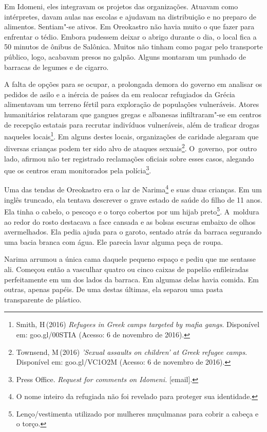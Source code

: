 Em Idomeni, eles integravam os projetos das organizações. Atuavam como
intérpretes, davam aulas nas escolas e ajudavam na distribuição e no
preparo de alimentos. Sentiam"-se ativos. Em Oreokastro não havia muito o
que fazer para enfrentar o tédio. Embora pudessem deixar o abrigo
durante o dia, o local fica a 50 minutos de ônibus de Salônica. Muitos
não tinham como pagar pelo transporte público, logo, acabavam presos no
galpão. Alguns montaram um punhado de barracas de legumes e de cigarro.

A falta de opções para se ocupar, a prolongada demora do governo em
analisar os pedidos de asilo e a inércia de países da  em realocar
refugiados da Grécia alimentavam um terreno fértil para exploração de
populações vulneráveis. Atores humanitários relataram que gangues gregas
e albanesas infiltraram"-se em centros de recepção estatais para recrutar
indivíduos vulneráveis, além de traficar drogas naqueles
locais\footnote{ Smith, H\,(2016) \emph{Refugees in Greek camps
targeted by mafia gangs}. Disponível em:
goo.gl/00STIA
(Acesso: 6 de novembro de 2016).}. Em alguns destes locais, organizações de
caridade alegaram que diversas crianças podem ter sido alvo de ataques
sexuais\footnote{ Townsend, M\,(2016) \emph{'Sexual assaults on
children' at Greek refugee camps}. Disponível em:
goo.gl/VC1O2M
(Acesso: 6 de novembro de 2016).}. O~governo, por outro lado, afirmou não ter registrado
reclamações oficiais sobre esses casos, alegando que os centros eram 
monitorados pela polícia\footnote{ Press Office. \emph{Request for comments on
Idomeni}\emph{.} {[}email{]}.}.

Uma das tendas de Oreokastro era o lar de Narima\footnote{ O nome inteiro da refugiada não foi revelado para
proteger sua identidade.}  e
suas duas crianças. Em um inglês truncado, ela tentava descrever o
grave estado de saúde do filho de 11 anos. Ela tinha o cabelo, o pescoço
e o torço cobertos por um hijab preto\footnote{ Lenço/vestimenta utilizado por mulheres
muçulmanas para cobrir a cabeça e o torço.}. A~moldura
ao redor do rosto destacava a face cansada e as bolsas escuras embaixo
de olhos avermelhados. Ela pedia ajuda para o garoto, sentado atrás da
barraca segurando uma bacia branca com água. Ele parecia lavar alguma peça
de roupa.

Narima arrumou a única cama daquele pequeno espaço e pediu que me
sentasse ali. Começou então a vasculhar quatro ou cinco caixas de
papelão enfileiradas perfeitamente em um dos lados da barraca. Em
algumas delas havia comida. Em outras, apenas papéis. De uma destas
últimas, ela separou uma pasta transparente de plástico.

